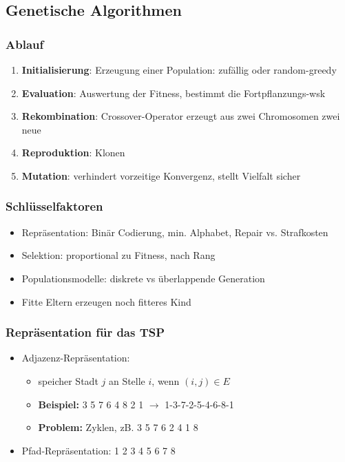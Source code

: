 \documentclass[12pt]{article}
\begin{document}
		\subsection{Genetische Algorithmen}
			\subsubsection{Ablauf}
				\begin{enumerate}
					\item \textbf{Initialisierung}: Erzeugung einer Population: zufällig oder random-greedy
					\item \textbf{Evaluation}: Auswertung der Fitness, bestimmt die Fortpflanzungs-wsk
					\item \textbf{Rekombination}: Crossover-Operator erzeugt aus zwei Chromosomen zwei neue
					\item \textbf{Reproduktion}: Klonen
					\item \textbf{Mutation}: verhindert vorzeitige Konvergenz, stellt Vielfalt sicher
				\end{enumerate}
			\subsubsection{Schlüsselfaktoren}
				\begin{itemize}
					\item Repräsentation: Binär Codierung, min. Alphabet, Repair vs. Strafkosten
					\item Selektion: proportional zu Fitness, nach Rang
					\item Populationsmodelle: diskrete vs überlappende Generation
					\item Fitte Eltern erzeugen noch fitteres Kind					
				\end{itemize}
			\subsubsection{Repräsentation für das TSP}
				\begin{itemize}
					\item Adjazenz-Repräsentation:
						\begin{itemize}
							\item speicher Stadt $j$ an Stelle $i$, wenn $(i,j)\in E$
							\item \textbf{Beispiel:} 3 5 7 6 4 8 2 1 $\rightarrow$ 1-3-7-2-5-4-6-8-1
							\item \textbf{Problem:} Zyklen, zB. 3 5 7 6 2 4 1 8
						\end{itemize}
					\item Pfad-Repräsentation: 1 2 3 4 5 6 7 8
				\end{itemize}
\end{document}
